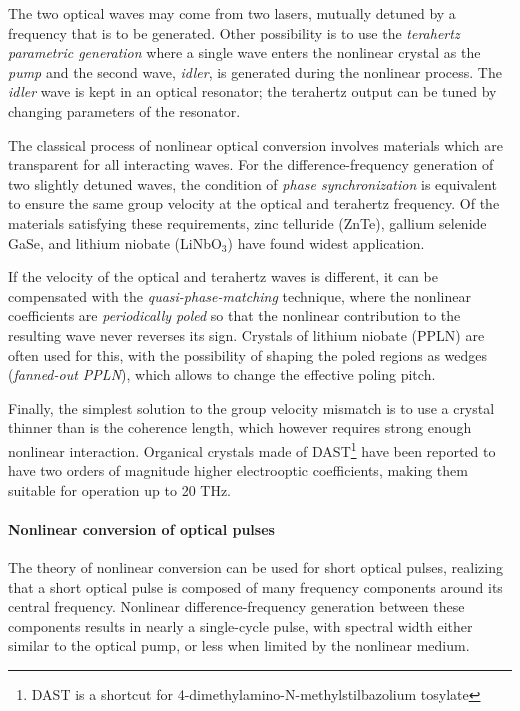 The two optical waves may come from two lasers, mutually detuned by a frequency that is to be generated. Other possibility is to use the \textit{terahertz parametric generation} where a single wave enters the nonlinear crystal as the \textit{pump} and the second wave, \textit{idler}, is generated during the nonlinear process. The \textit{idler} wave is kept in an optical resonator; the terahertz output can be tuned by changing parameters of the resonator.

The classical process of nonlinear optical conversion involves materials which are transparent for all interacting waves. For the difference-frequency generation of two slightly detuned waves, the condition of \textit{phase synchronization} is equivalent to ensure the same group velocity at the optical and terahertz frequency. Of the materials satisfying these requirements, zinc telluride (ZnTe), gallium selenide GaSe, and lithium niobate (LiNbO$_{3}$) have found widest application. 

If the velocity of the optical and terahertz waves is different, it can be compensated with the \textit{quasi-phase-matching} technique, where the nonlinear coefficients are \textit{periodically poled} so that the nonlinear contribution to the resulting wave never reverses its sign. Crystals of lithium niobate (PPLN) are often used for this, with the possibility of shaping the poled regions as wedges (\textit{fanned-out PPLN}), which allows to change the effective poling pitch.

Finally, the simplest solution to the group velocity mismatch is to use a crystal thinner than is the coherence length, which however requires strong enough nonlinear interaction.
Organical crystals made of DAST\footnote{DAST is a shortcut for 4-dimethylamino-N-methylstilbazolium tosylate} have been reported\cite{han2000use} to have two orders of magnitude higher electrooptic coefficients, making them suitable for operation up to 20 THz.

\paragraph{Nonlinear conversion of optical pulses}
The theory of nonlinear conversion can be used for short optical pulses, realizing that a short optical pulse is composed of many frequency components around its central frequency. Nonlinear difference-frequency generation between these components results in nearly a single-cycle pulse, with spectral width either similar to the optical pump, or less when limited by the nonlinear medium.

